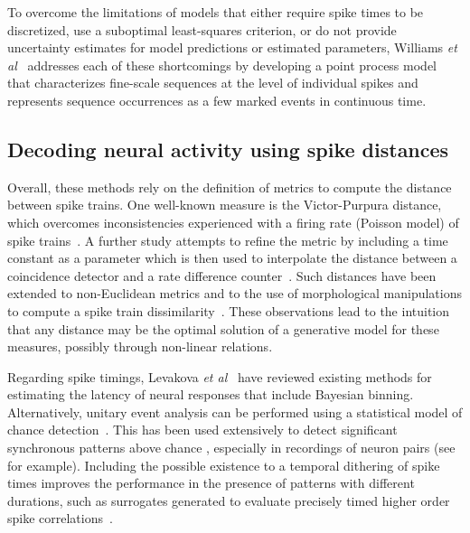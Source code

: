 \documentclass[runningheads]{llncs}
\begin{document}
To overcome the limitations of models that either require spike times to be discretized, use a suboptimal least-squares criterion, or do not provide uncertainty estimates for model predictions or estimated parameters, Williams {\it et al}~\cite{williams_point_2020} addresses each of these shortcomings by developing a point process model that characterizes fine-scale sequences at the level of individual spikes and represents sequence occurrences as a few marked events in continuous time. %
%
\subsection{Decoding neural activity using spike distances}
%
Overall, these methods rely on the definition of metrics to compute the distance between spike trains. One well-known measure is the Victor-Purpura distance, which overcomes inconsistencies experienced with a firing rate (Poisson model) of spike trains~\cite{victor_nature_1996}. A further study attempts to refine the metric by including a time constant as a parameter which is then used to interpolate the distance between a coincidence detector and a rate difference counter~\cite{van_rossum_novel_2001}. Such distances have been extended to non-Euclidean metrics and to the use of morphological manipulations to compute a spike train dissimilarity~\cite{kreuz_measuring_2007}. These observations lead to the intuition that any distance may be the optimal solution of a generative model for these measures, possibly through non-linear relations.%

Regarding spike timings, Levakova {\it et al}~\cite{levakova_review_2015} have reviewed existing methods for estimating the latency of neural responses that include Bayesian binning. Alternatively, unitary event analysis can be performed using a statistical model of chance detection~\cite{grun_unitary_2002-1}. This has been used extensively to detect significant synchronous patterns above chance%
, especially in recordings of neuron pairs (see~\cite{riehle_spike_1997} for example). %
Including the possible existence to a temporal dithering of spike times improves the performance in the presence of patterns with different durations, such as surrogates generated to evaluate precisely timed higher order spike correlations~\cite{stella_comparing_2022}. %
%
\end{document}
